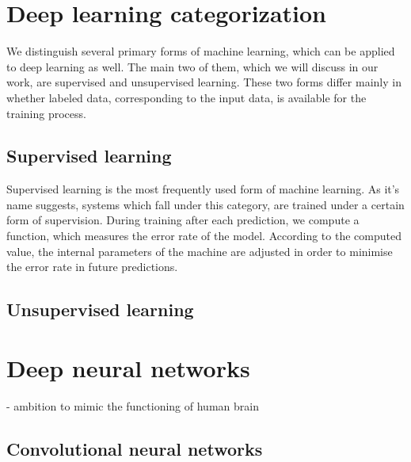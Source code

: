 \section{Deep learning categorization}
We distinguish several primary forms of machine learning, which can be applied to deep learning as well. The main two of them, which we will discuss in our work, are supervised and unsupervised learning. \cite{lecundeeplearning} These two forms differ mainly in whether labeled data, corresponding to the input data, is available for the training process.
\subsection*{Supervised learning}
Supervised learning  is the most frequently used form of machine learning. \cite{lecundeeplearning} As it's name suggests, systems which fall under this category, are trained under a certain form of supervision. During training after each prediction, we compute a function, which measures the error rate of the model. According to the computed value, the internal parameters of the machine are adjusted in order to minimise the error rate in future predictions. 

\subsection*{Unsupervised learning} 


\section{Deep neural networks}
- ambition to mimic the functioning of human brain
\subsection{Convolutional neural networks}
